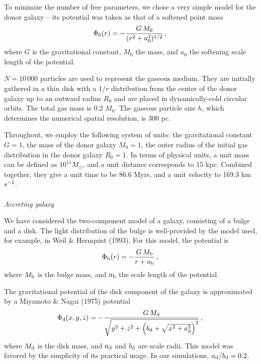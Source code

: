 To minimize the number of free parameters, we chose a very simple 
model for the donor galaxy -- its potential was taken as that of 
a softened point mass
\begin{equation}
\Phi_0(r) = - \frac{G\, M_0}{(r^2+a_0^2)^{1/2}} \, ,\\
\label{spiral}
\end{equation} 
where $G$ is the gravitational constant, $M_0$ the mass, and 
$a_0$ the softening scale length of the potential. 

$N = 10\,000$ particles are used to represent the gaseous medium. 
They are initially gathered in a thin disk with a $1/r$ distribution 
from the center of the donor galaxy up to an outward radius $R_0$ and 
are placed in dynamically-cold circular orbits. The total gas mass 
is 0.2 $M_0$. The gaseous particle size $h$, which 
determines the numerical spatial resolution, is 300 pc.

Throughout, we employ the following system of units: the gravitational 
constant $G = 1$, the mass of the donor galaxy $M_0 = 1$, the outer 
radius of the initial gas distribution in the donor galaxy $R_0 = 1$. 
In terms of physical units, a unit mass can be defined as 
$10^{11} M_{\odot}$, and a unit distance corresponds to 15 kpc. 
Combined together, they give a unit time to be 86.6 Myrs, 
and a unit velocity to 169.3 km ${\rm s}^{-1}$. \\ \\
{\it Accreting galaxy}

We have considered the two-component model of a galaxy, consisting 
of a bulge and a disk. The light 
distribution of the bulge is well-provided by 
the model used, for example, in Weil \& Hernquist (1993). For 
this model, the potential is
\begin{equation}
\Phi_{\rm b}(r) = - \frac{G\, M_{\rm b}}{r+a_{\rm b}} \, ,\\
\label{bulge}
\end{equation} 
where $M_{\rm b}$ is the bulge mass, and $a_{\rm b}$ the 
scale length of the potential. 

The gravitational potential of the disk component of the galaxy 
is approximated by a Miyamoto \& Nagai (1975) potential
\begin{equation}
\Phi_{\rm d}(x,y,z) = - \frac{G\,M_{\rm d}}{\sqrt{y^2 + z^2 + 
\left(b_{\rm d}+\sqrt{x^2 + a_{\rm d}^2}\right)^2}} \, ,\\
\label{disk}
\end{equation}
where $M_{\rm d}$ is the disk mass, and 
$a_{\rm d}$ and $b_{\rm d}$ are scale radii. 
This model was favored 
by the simplicity of its practical usage. In our simulations,  
$a_{\rm d}/b_{\rm d} = 0.2$.

